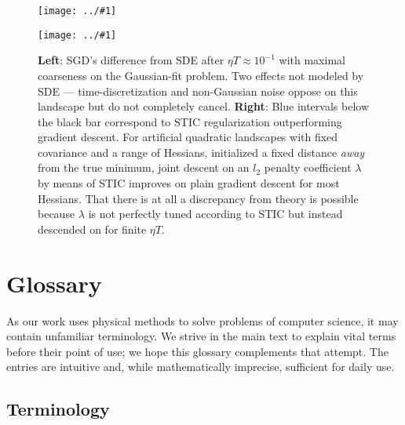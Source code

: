 \documentclass{article}
\theoremstyle{plain}
\theoremstyle{definition}
\newcommand{\plotmoo}[3]{
    \texttt{[image: ../\#1]}
}
\begin{document}
    \begin{figure}[h] 
        \centering
        \plotmoo{plots/vs-sde}{0.48\columnwidth}{4.0cm}
        \plotmoo{plots/tak-reg}{0.48\columnwidth}{4.0cm}
        \caption{
            {\bf Left}: SGD's difference from SDE after $\eta T \approx
            10^{-1}$ with maximal coarseness on the Gaussian-fit problem.  
            Two effects not modeled by SDE --- time-discretization and
            non-Gaussian noise oppose on this landscape but do not
            completely cancel. 
            {\bf Right}: Blue intervals below the black bar correspond to STIC
            regularization outperforming gradient descent. For artificial
            quadratic landscapes with fixed covariance and a range of Hessians,
            initialized a fixed distance \emph{away} from the true minimum,
            joint descent on an $l_2$ penalty coefficient $\lambda$ by means of
            STIC improves on plain gradient descent for most Hessians.  That
            there is at all a discrepancy from theory is possible because
            $\lambda$ is not perfectly tuned according to STIC but instead
            descended on for finite $\eta T$.
        }
        \label{fig:vssdeandtakreg}
    \end{figure}


\section{Glossary}\label{sect:glossary}

    As our work uses physical methods to solve problems of computer science, it
    may contain unfamiliar terminology.  We strive in the main text to explain
    vital terms before their point of use; we hope this glossary complements
    that attempt.  The entries are intuitive and, while mathematically
    imprecise, sufficient for daily use.

    \subsection{Terminology}
\end{document}
